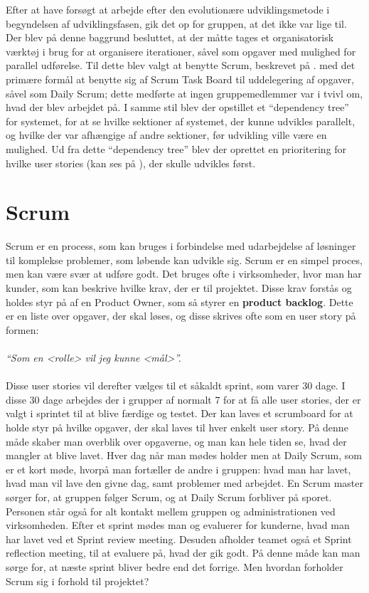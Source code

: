 Efter at have forsøgt at arbejde efter den evolutionære udviklingsmetode i begyndelsen af udviklingsfasen, gik det op for gruppen, at det ikke var lige til.
Der blev på denne baggrund besluttet, at der måtte tages et organisatorisk værktøj i brug for at organisere iterationer, såvel som opgaver med mulighed for parallel udførelse.
Til dette blev valgt at benytte Scrum, beskrevet på . med det primære formål at benytte sig af Scrum Task Board til uddelegering af opgaver, såvel som Daily Scrum; dette medførte at ingen gruppemedlemmer var i tvivl om, hvad der blev arbejdet på.
I samme stil blev der opstillet et ``dependency tree'' for systemet, for at se hvilke sektioner af systemet, der kunne udvikles parallelt, og hvilke der var afhængige af andre sektioner, før udvikling ville være en mulighed.
Ud fra dette ``dependency tree'' blev der oprettet en prioritering for hvilke user stories (kan ses på ), der skulle udvikles først.

\section{Scrum}\label{scrum}
Scrum er en process, som kan bruges i forbindelse med udarbejdelse af løsninger til komplekse problemer, som løbende kan udvikle sig. 
Scrum er en simpel proces, men kan være svær at udføre godt.
Det bruges ofte i virksomheder, hvor man har kunder, som kan beskrive hvilke krav, der er til projektet.
Disse krav forstås og holdes styr på af en Product Owner, som så styrer en \textbf{product backlog}.
Dette er en liste over opgaver, der skal løses, og disse skrives ofte som en user story på formen:\\ \\ \textit{``Som en <rolle> vil jeg kunne <mål>''. }\\ \\
Disse user stories vil derefter vælges til et såkaldt sprint, som varer 30 dage. 
I disse 30 dage arbejdes der i grupper af normalt 7 for at få alle user stories, der er valgt i sprintet til at blive færdige og testet.
Der kan laves et scrumboard for at holde styr på hvilke opgaver, der skal laves til hver enkelt user story. 
På denne måde skaber man overblik over opgaverne, og man kan hele tiden se, hvad der mangler at blive lavet.
Hver dag når man mødes holder men at Daily Scrum, som er et kort møde, hvorpå man fortæller de andre i gruppen: hvad man har lavet, hvad man vil lave den givne dag, samt problemer med arbejdet.
En Scrum master sørger for, at gruppen følger Scrum, og at Daily Scrum forbliver på sporet. 
Personen står også for alt kontakt mellem gruppen og administrationen ved virksomheden.
Efter et sprint mødes man og evaluerer for kunderne, hvad man har lavet ved et Sprint review meeting.
Desuden afholder teamet også et Sprint reflection meeting, til at evaluere på, hvad der gik godt.
På denne måde kan man sørge for, at næste sprint bliver bedre end det forrige. 
Men hvordan forholder Scrum sig i forhold til projektet?

